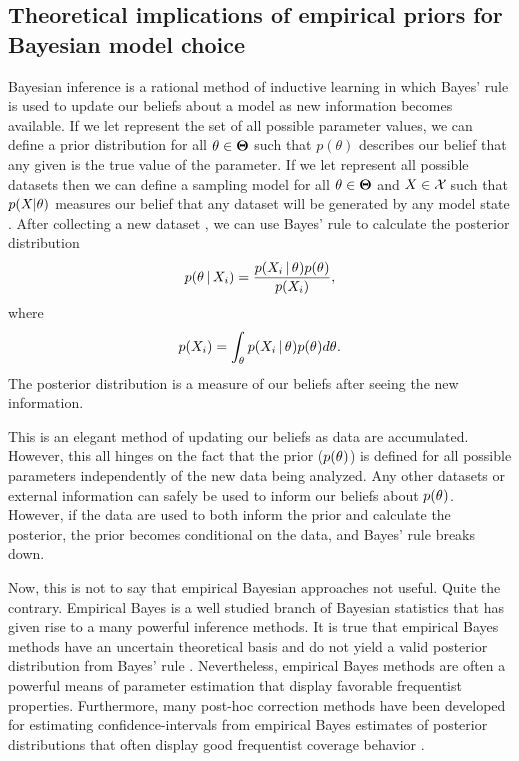 \documentclass[letterpaper,12pt]{article}
\begin{document}
\begin{linenumbers}
\subsection*{Theoretical implications of empirical priors for Bayesian model
choice}
\begin{linenomath}
Bayesian inference is a rational method of inductive learning in which Bayes'
rule is used to update our beliefs about a model as new information becomes
available.
If we let \allParameterValues represent the set of all possible parameter
values, we can define a prior distribution for all $\theta \in
\boldsymbol{\Theta}$ such that $p(\theta)$ describes our belief that any given
\myTheta{} is the true value of the parameter.
If we let \allDatasets represent all possible datasets then we can 
define a sampling model for all $\theta \in
\boldsymbol{\Theta}$ and $\alignment{}{} \in \allDatasets$ such that
$p(\alignment{}{} | \theta)$ measures our belief that any dataset \alignment{}{}
will be generated by any model state \myTheta{}.
After collecting a new dataset , we can use Bayes' rule to
calculate the posterior distribution
\begin{equation}
    p(\myTheta{} \given \alignment{i}{}) = \frac{p(\alignment{i}{} \given 
    \myTheta{})p(\myTheta{})}{p(\alignment{i}{})},
    \label{eq:bayesrule}
\end{equation}
where
\begin{equation}
    p(\alignment{i}{}) = \int_{\myTheta{}} p(\alignment{i}{} \given
    \myTheta{})p(\myTheta{}) d\myTheta{}.
\end{equation}
The posterior distribution is a measure of our beliefs after seeing the new
information.
\end{linenomath}

This is an elegant method of updating our beliefs as data are accumulated.
However, this all hinges on the fact that the prior ($p(\theta_{})$) is
defined for all possible parameters independently of the new data being
analyzed.
Any other datasets or external information can safely be used to inform our
beliefs about $p(\theta_{})$.
However, if the data are used to both inform the prior and calculate the
posterior, the prior becomes conditional on the data, and Bayes' rule breaks
down.

Now, this is not to say that empirical Bayesian approaches not useful.
Quite the contrary.
Empirical Bayes is a well studied branch of Bayesian statistics that
has given rise to a many powerful inference methods.
It is true that empirical Bayes methods have an uncertain theoretical basis and
do not yield a valid posterior distribution from Bayes' rule \citep[e.g.,
empirical Bayesian estimates of the posterior are often too narrow, off-center,
and misshapen;][]{Morris1983,Laird1987,Carlin1990,Efron2013}.
Nevertheless, empirical Bayes methods are often a powerful means of parameter
estimation that display favorable frequentist properties.
Furthermore, many post-hoc correction methods have been developed for
estimating confidence-intervals from empirical Bayes estimates of posterior
distributions that often display good frequentist coverage behavior
\citep{Morris1983,Laird1987,Laird1989, Carlin1990,Hwang2009}.


\end{linenumbers}
\end{document}
